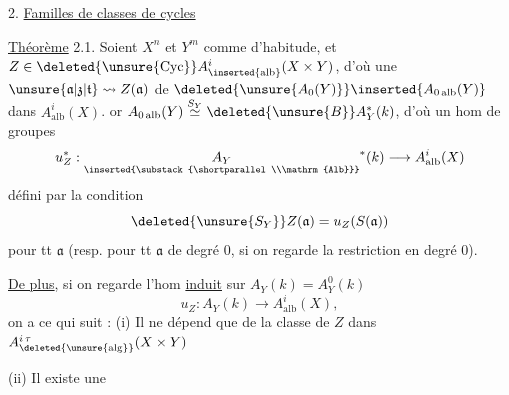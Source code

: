 2. \uline{Familles de classes de cycles  }

\uline{Théorème} 2.1. Soient $X^n$ et $Y^m$ comme d'habitude,
et $Z\in\deleted{\unsure{\operatorname{Cyc}}}A^{i}_{\inserted{\mathrm{alb}}}(X\times Y)$, d'où une  
$\unsure{\mathfrak{a}|\mathfrak{z}|\mathfrak{t}}\leadsto Z(\mathfrak{a})$ de $\deleted{\unsure{A_0(Y)}}\inserted{A_{0\,\mathrm{alb}}(Y)}$ dans $A^i_{\mathrm{alb}}(X)$.  or $A_{0\,\mathrm{alb}}(Y)\overset{S_Y}{\simeq}\deleted{\unsure{B}}A_Y^*(k)$,
d'où un hom de groupes
\[
u_Z^*:\underset{\inserted{\substack{\shortparallel\\\mathrm{Alb}}}}{A_Y}^{*}(k)\longrightarrow A^i_{\mathrm{alb}}(X)
\]
 défini par la
condition
\[
\deleted{\unsure{S_Y}}Z(\mathfrak{a})=u_Z(S(\mathfrak{a}))
\]
pour tt $\mathfrak{a}$ (resp. pour tt $\mathfrak{a}$ de degré 0,
si on regarde la restriction en degré 0).

\uline{De plus}, si on regarde l'hom \uline{induit}
sur $A_Y(k)=A_Y^0(k)$
\[
u_Z:A_Y(k)\longrightarrow A^i_{\mathrm{alb}}(X),
\]
on a ce qui suit : 
(i) Il ne dépend que de la classe de $Z$ dans
$A^{i\,\tau}_{\deleted{\unsure{\mathrm{alg}}}}(X\times Y)$ \margin{[A réserver pour plus tard}

(ii) Il existe une 
